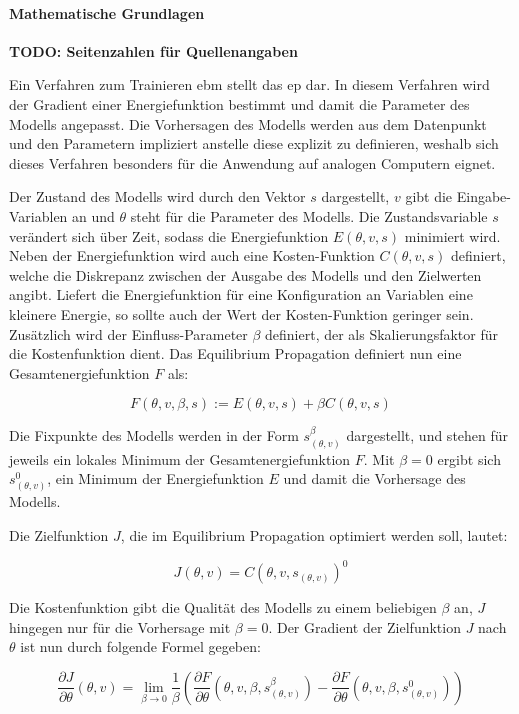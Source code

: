 \paragraph{Mathematische Grundlagen}

\textbf{TODO: Seitenzahlen für Quellenangaben}

Ein Verfahren zum Trainieren \ac{ebm} stellt das \ac{ep} dar. In diesem Verfahren wird der Gradient einer Energiefunktion bestimmt und damit die Parameter des Modells angepasst. Die Vorhersagen des Modells werden aus dem Datenpunkt und den Parametern impliziert anstelle diese explizit zu definieren, weshalb sich dieses Verfahren besonders für die Anwendung auf analogen Computern eignet. \cite{Scellier2017}

Der Zustand des Modells wird durch den Vektor \(s\) dargestellt, \(v\) gibt die Eingabe-Variablen an und \(\theta\) steht für die Parameter des Modells. Die Zustandsvariable \(s\) verändert sich über Zeit, sodass die Energiefunktion \(E(\theta,v,s)\) minimiert wird. Neben der Energiefunktion wird auch eine Kosten-Funktion \(C(\theta,v,s)\) definiert, welche die Diskrepanz zwischen der Ausgabe des Modells und den Zielwerten angibt. Liefert die Energiefunktion für eine Konfiguration an Variablen eine kleinere Energie, so sollte auch der Wert der Kosten-Funktion geringer sein. Zusätzlich wird der Einfluss-Parameter \(\beta\) definiert, der als Skalierungsfaktor für die Kostenfunktion dient. Das Equilibrium Propagation definiert nun eine Gesamtenergiefunktion \(F\) als:

\[F(\theta,v,\beta,s):=E(\theta,v,s)+\beta C(\theta,v,s)\]

Die Fixpunkte des Modells werden in der Form \(s_{(\theta,v)}^\beta\) dargestellt, und stehen für jeweils ein lokales Minimum der Gesamtenergiefunktion \(F\). Mit \(\beta=0\) ergibt sich \(s_{(\theta,v)}^0\), ein Minimum der Energiefunktion \(E\) und damit die Vorhersage des Modells. \cite{Scellier2017}

Die Zielfunktion \(J\), die im Equilibrium Propagation optimiert werden soll, lautet:

\[J(\theta,v)=C(\theta,v,s_{(\theta,v)})^0\]

Die Kostenfunktion gibt die Qualität des Modells zu einem beliebigen \(\beta\) an, \(J\) hingegen nur für die Vorhersage mit \(\beta=0\). Der Gradient der Zielfunktion \(J\) nach \(\theta\) ist nun durch folgende Formel gegeben:

\[\frac{\partial J}{\partial \theta}(\theta,v)=\lim\limits_{\beta \to 0}\frac{1}{\beta}\left(\frac{\partial F}{\partial \theta}(\theta,v,\beta,s_{(\theta,v)}^\beta)-\frac{\partial F}{\partial \theta}(\theta,v,\beta,s_{(\theta,v)}^0)\right)\]

